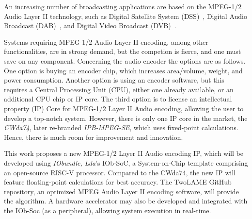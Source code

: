 

An increasing number of broadcasting applications are based on the MPEG-1/2
Audio Layer II technology, such as Digital Satellite System (DSS)~\cite{dss},
Digital Audio Broadcast (DAB)~\cite{dab}, and Digital Video Broadcast
(DVB)~\cite{dvb}.

Systems requiring MPEG-1/2 Audio Layer II encoding, among other functionalities,
are in strong demand, but the competion is fierce, and one must save on any
component. Concerning the audio encoder the options are as follows. One option
is buying an encoder chip, which increases area/volume, weight, and power
consumption. Another option is using an encoder software, but this requires a
Central Processing Unit (CPU), either one already available, or an additional
CPU chip or IP core. The third option is to license an intellectual property
(IP) Core for MPEG-1/2 Layer II Audio encoding, allowing the user to develop a
top-notch system. However, there is only one IP core in the market,
the \textit{CWda74}, later re-branded \textit{IPB-MPEG-SE}, which uses
fixed-point calculations. Hence, there is much room for improvement and
innovation.

This work proposes a new MPEG-1/2 Layer II Audio encoding IP, which will be
developed using \textit{IObundle, Lda}'s IOb-SoC, a System-on-Chip template
comprising an open-source RISC-V processor. Compared to the CWda74, the new IP
will feature floating-point calculations for best accuracy. The TwoLAME GitHub
repository, an optimized MPEG Audio Layer II encoding software, will provide the
algorithm.  A hardware accelerator may also be developed and integrated with the
IOb-Soc (as a peripheral), allowing system execution in real-time.
